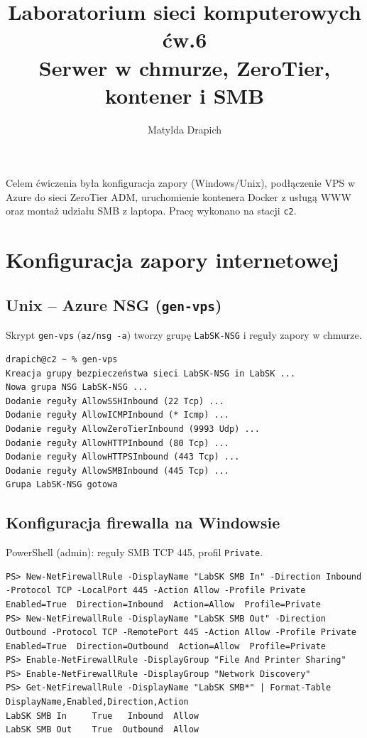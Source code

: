 \documentclass[a4paper,11pt]{article}
\author{Matylda Drapich}
\title{Laboratorium sieci komputerowych\\ćw.6\\Serwer w chmurze, ZeroTier, kontener i SMB}
\begin{document}
\thispagestyle{empty}
\maketitle

\vspace{-0.5em}
Celem ćwiczenia była konfiguracja zapory (Windows/Unix), podłączenie VPS
w Azure do sieci ZeroTier ADM, uruchomienie kontenera Docker z usługą WWW
oraz montaż udziału SMB z laptopa. Pracę wykonano na stacji \texttt{c2}.

\section{Konfiguracja zapory internetowej}

\subsection{Unix -- Azure NSG (\texttt{gen-vps})}

Skrypt \texttt{gen-vps} (\texttt{az/nsg -a}) tworzy grupę \texttt{LabSK-NSG}
i reguły zapory w chmurze.

\begin{lstlisting}
drapich@c2 ~ % gen-vps
Kreacja grupy bezpieczeństwa sieci LabSK-NSG in LabSK ...
Nowa grupa NSG LabSK-NSG ...
Dodanie reguły AllowSSHInbound (22 Tcp) ...
Dodanie reguły AllowICMPInbound (* Icmp) ...
Dodanie reguły AllowZeroTierInbound (9993 Udp) ...
Dodanie reguły AllowHTTPInbound (80 Tcp) ...
Dodanie reguły AllowHTTPSInbound (443 Tcp) ...
Dodanie reguły AllowSMBInbound (445 Tcp) ...
Grupa LabSK-NSG gotowa
\end{lstlisting}

\subsection{Konfiguracja firewalla na Windowsie}

PowerShell (admin): reguły SMB TCP 445, profil \texttt{Private}.

\begin{lstlisting}
PS> New-NetFirewallRule -DisplayName "LabSK SMB In" -Direction Inbound -Protocol TCP -LocalPort 445 -Action Allow -Profile Private
Enabled=True  Direction=Inbound  Action=Allow  Profile=Private
PS> New-NetFirewallRule -DisplayName "LabSK SMB Out" -Direction Outbound -Protocol TCP -RemotePort 445 -Action Allow -Profile Private
Enabled=True  Direction=Outbound  Action=Allow  Profile=Private
PS> Enable-NetFirewallRule -DisplayGroup "File And Printer Sharing"
PS> Enable-NetFirewallRule -DisplayGroup "Network Discovery"
PS> Get-NetFirewallRule -DisplayName "LabSK SMB*" | Format-Table DisplayName,Enabled,Direction,Action
LabSK SMB In     True   Inbound  Allow
LabSK SMB Out    True  Outbound  Allow
\end{lstlisting}
\end{document}
